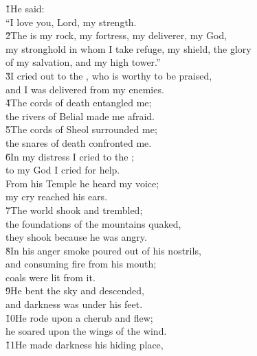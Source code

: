 \begin{poetry}
\poeml \v{1}He said: \\
\poemll    ``I love you, Lord, my strength. \\
\poeml \v{2}The  is my rock, my fortress, my deliverer, my God, \\
\poemll    my stronghold in whom I take refuge, my shield, the glory \\
\poemlll       of my salvation, and my high tower.'' \\
\poeml \v{3}I cried out to the , who is worthy to be praised, \\
\poemll    and I was delivered from my enemies. \\
\poeml \v{4}The cords of death entangled me; \\
\poemll    the rivers of Belial made me afraid. \\
\poeml \v{5}The cords of Sheol surrounded me; \\
\poemll    the snares of death confronted me. \\
\poeml \v{6}In my distress I cried to the ; \\
\poemll    to my God I cried for help. \\
\poeml From his Temple he heard my voice; \\
\poemll    my cry reached his ears. \\
\poeml \v{7}The world shook and trembled; \\
\poemll    the foundations of the mountains quaked, \\
\poemlll       they shook because he was angry. \\
\poeml \v{8}In his anger smoke poured out of his nostrils, \\
\poemll    and consuming fire from his mouth; \\
\poemlll       coals were lit from it. \\
\poeml \v{9}He bent the sky and descended, \\
\poemll    and darkness was under his feet. \\
\poeml \v{10}He rode upon a cherub and flew; \\
\poemll    he soared upon the wings of the wind. \\
\poeml \v{11}He made darkness his hiding place, \\

\end{poetry}
